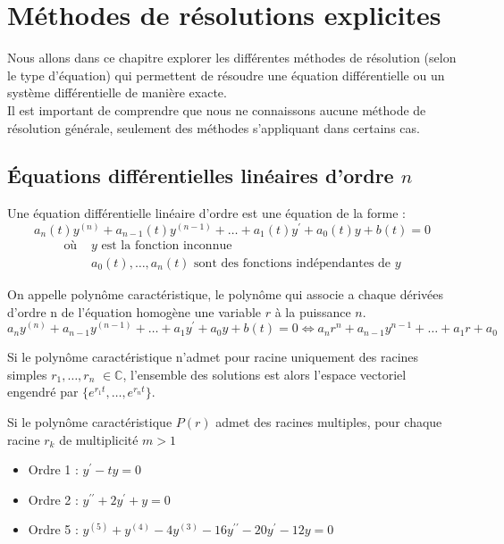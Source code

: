 \chapter{Méthodes de résolutions explicites}
Nous allons dans ce chapitre explorer les différentes méthodes de résolution (selon le type d'équation) qui permettent de résoudre une équation différentielle ou un système différentielle de manière exacte.\\
Il est important de comprendre que nous ne connaissons aucune méthode de résolution générale, seulement des méthodes s'appliquant dans certains cas.
\section{Équations différentielles linéaires d'ordre $n$}
\begin{defi}
Une équation différentielle linéaire d'ordre est une équation de la forme :
$$a_n(t)y^{(n)}+a_{n-1}(t)y^{(n-1)}+\hdots+a_1(t)y^{\prime}+a_0(t)y+b(t)=0$$
\begin{align*}
    \text{où } & y \text{ est la fonction inconnue}\\
    & a_0(t),\hdots,a_n(t) \text{ sont des fonctions indépendantes de }y
\end{align*}
\end{defi}

\begin{prop}
On appelle polynôme caractéristique, le polynôme qui associe a chaque dérivées d'ordre n de l'équation homogène une variable $r$ à la puissance $n$.
$$a_ny^{(n)}+a_{n-1}y^{(n-1)}+\hdots+a_1y^{\prime}+a_0y+b(t)=0\Leftrightarrow a_nr^{n}+a_{n-1}y^{n-1}+\hdots+a_1r+a_0$$
\end{prop}
\begin{thm}[Théorème]
Si le polynôme caractéristique n'admet pour racine uniquement des racines simples $r_1,\hdots,r_n$ $\in\mathbb{C}$, l'ensemble des solutions est alors l'espace vectoriel engendré par $\{e^{r_1t},\hdots,e^{r_nt}\}$.
\end{thm}
\begin{thm}[Théorème]
Si le polynôme caractéristique $P(r)$ admet des racines multiples, pour chaque racine $r_k$ de multiplicité $m>1$
\end{thm}

\begin{ex}
\begin{itemize}
    \item Ordre 1 : $y^{\prime}-ty=0$
    \item Ordre 2 : $y^{\prime\prime}+2y^{\prime}+y=0$
    \item Ordre 5 : $y^{(5)}+y^{(4)}-4y^{(3)}-16y^{\prime\prime}-20y^{\prime}-12y=0$
\end{itemize}
\end{ex}




